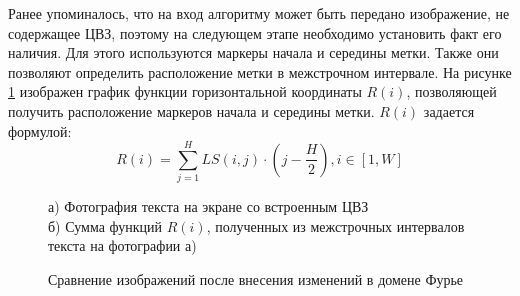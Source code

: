 \documentclass[12pt,a4paper]{article}
\begin{document}
Ранее упоминалось, что на вход алгоритму может быть передано изображение, не содержащее ЦВЗ, поэтому на следующем этапе необходимо установить факт  его наличия.
Для этого используются маркеры начала и середины метки.
Также они позволяют определить расположение метки в межстрочном интервале.
На рисунке \ref{fig:det_row} изображен график функции горизонтальной координаты $R(i)$, позволяющей получить расположение маркеров начала и середины метки. $R(i)$ задается формулой:
$$R(i) = \sum_{j=1}^HLS(i,j)\cdot\left(j - \frac{H}{2}\right), i \in [1,W]$$
\newpage
\begin{figure}[h]
 а) Фотография текста на экране со встроенным ЦВЗ \\
 б) Сумма функций $R(i)$, полученных из межстрочных интервалов текста на фотографии а) \\
\caption{Сравнение изображений после внесения изменений в домене Фурье}
\label{fig:det_row}
\end{figure}
\end{document}
